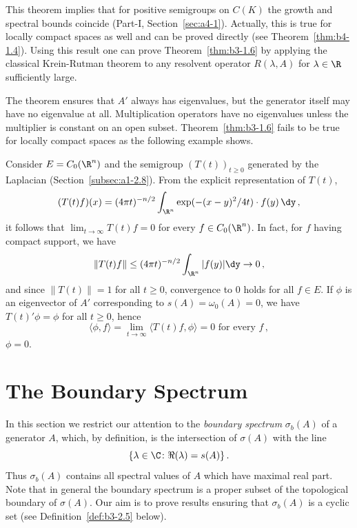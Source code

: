 This theorem implies that for positive semigroups on $C(K)$ the growth and spectral bounds coincide (\cf Part-I, Section~\ref{sec:a4-1}).
Actually, this is true for locally compact spaces as well and can be proved directly (see Theorem~\ref{thm:b4-1.4}).
Using this result one can prove Theorem~\ref{thm:b3-1.6} by applying the classical Krein-Rutman theorem to any resolvent operator $R(\lambda,A)$ for $\lambda \in \R$ sufficiently large.

The theorem ensures that $A'$ always has eigenvalues, but the generator itself may have no eigenvalue at all.
Multiplication operators have no eigenvalues unless the multiplier is constant on an open subset.
Theorem~\ref{thm:b3-1.6} fails to be true for locally compact spaces as the following example shows.
\begin{example}\label{ex:b3-1.7}
	Consider $E = C_{0}(\R^{n})$ and the semigroup $(T(t))_{t \geq 0}$ generated by the Laplacian (\cf Section~\ref{subsec:a1-2.8}).
From the explicit representation of\/ $T(t)$,
	\begin{equation}\label{eq:b3-1.17}
		(T(t)f)(x) = (4\pi t)^{-n/2}\int_{\R^{n}} \exp(-(x-y)^{2}/4t)\cdot f(y) \, \dy \,,
	\end{equation}
	it follows that $\lim_{t \to \infty}T(t)f = 0$ for every $f \in C_{0}(\R^{n})$. In fact, for $f$ having compact support, we have     
    \[
    \|T(t)f\| \leq (4\pi t)^{-n/2}\int_{\R^{n}} |f(y)| \dy \to 0\,,
    \]
    and since $\|T(t)\| = 1$ for all $t \geq 0$, convergence to $0$ holds for all  $f\in E$.
	If\/ $\phi$ is an eigenvector of\/ $A'$ corresponding to $s(A) = \omega_{0}(A) = 0$, we have $T(t)'\phi = \phi$ for all $t \geq 0$, hence 
    \[
    \langle \phi,f \rangle = \lim_{t \to \infty}\langle T(t)f,\phi \rangle = 0 \text{ for every } f\,,
    \]
    \ie $\phi = 0$.
\end{example}
\section{The Boundary Spectrum}\label{sec:b3-2}%
In this section we restrict our attention to the \emph{boundary spectrum}%
$\sigma_{b}(A)$ of a generator $A$, which, by definition, is the intersection of\/ $\sigma(A)$ with the line 
\[
\{\lambda \in \C \colon \Re(\lambda) = s(A)\}\,.
\]
Thus $\sigma_{b}(A)$ contains all spectral values of\/ $A$ which have maximal real part.
Note that in general the boundary spectrum is a proper subset of the topological boundary of\/ $\sigma(A)$.
Our aim is to prove results ensuring that $\sigma_{b}(A)$ is a cyclic set (see Definition~\ref{def:b3-2.5} below).

